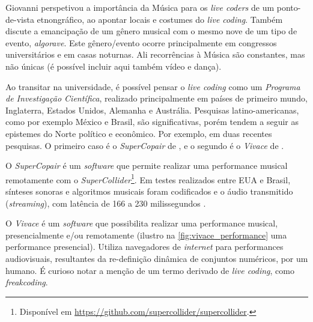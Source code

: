 Giovanni  perspetivou a importância da Música para os \emph{live coders} de um ponto-de-vista etnongráfico, ao apontar locais e costumes do \emph{live coding}. Também discute a emancipação de um gênero musical com o mesmo nove de um tipo de evento, \emph{algorave}. Este gênero/evento ocorre principalmente em congressos universitários e em casas noturnas. Ali recorrências à Música são constantes, mas não únicas (é possível incluir aqui também vídeo e dança).

Ao transitar na universidade, é possível pensar o \emph{live coding} como um \emph{Programa de Investigação Científica}, realizado principalmente em países de primeiro mundo, Inglaterra, Estados Unidos, Alemanha e Austrália. Pesquisas latino-americanas, como por exemplo México e Brasil, são significativas, porém tendem a seguir as epistemes do Norte político e econômico. Por exemplo, em duas recentes pesquisas. O primeiro caso é o \emph{SuperCopair} de , e o segundo é o  \emph{Vivace} de .

O \emph{SuperCopair}  é um \emph{software} que permite realizar uma performance musical remotamente com o \emph{SuperCollider}\footnote{Disponível em \url{https://github.com/supercollider/supercollider}.}. Em testes realizados entre EUA e Brasil, sínteses sonoras e algoritmos musicais foram codificados e o áudio transmitido (\emph{streaming}), com latência de 166 a 230 milissegundos \cite[p.~153]{junior_supercopair_2015}. 

O \emph{Vivace} é um \emph{software} que  possibilita realizar uma performance musical, presencialmente e/ou remotamente (ilustro na \autoref{fig:vivace_performance} uma performance presencial). Utiliza navegadores de \emph{internet} para performances audiovisuais, resultantes da re-definição dinâmica de conjuntos numéricos, por um humano. É curioso notar a menção de um termo derivado de \emph{live coding}, como \emph{freakcoding}.

